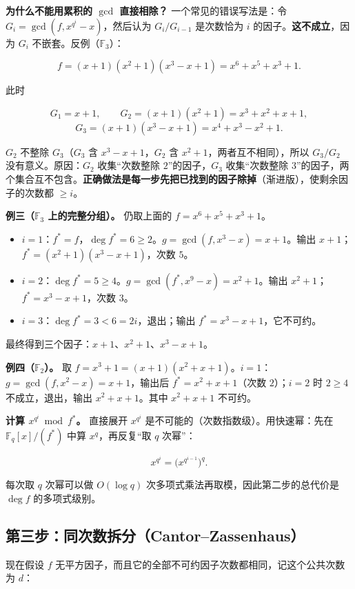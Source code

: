 \textbf{为什么不能用累积的 $\gcd$ 直接相除？} 一个常见的错误写法是：令 $G_i=\gcd(f,x^{q^i}-x)$，然后认为 $G_i/G_{i-1}$ 是次数恰为 $i$ 的因子。\textbf{这不成立}，因为 $G_i$ 不嵌套。反例（$\mathbb F_3$）：

\[
f=(x+1)(x^2+1)(x^3-x+1)=x^6+x^5+x^3+1 .
\]

此时

\[
G_1=x+1,\qquad G_2=(x+1)(x^2+1)=x^3+x^2+x+1,
\]
\[
G_3=(x+1)(x^3-x+1)=x^4+x^3-x^2+1 .
\]

$G_2$ 不整除 $G_3$（$G_3$ 含 $x^3-x+1$，$G_2$ 含 $x^2+1$，两者互不相同），所以 $G_3/G_2$ 没有意义。原因：$G_2$ 收集“次数整除 $2$”的因子，$G_3$ 收集“次数整除 $3$”的因子，两个集合互不包含。\textbf{正确做法是每一步先把已找到的因子除掉}（渐进版），使剩余因子的次数都 $\ge i$。

\textbf{例三（$\mathbb F_3$ 上的完整分组）。} 仍取上面的 $f=x^6+x^5+x^3+1$。

\begin{itemize}
\item $i=1$：$f^\ast=f$，$\deg f^\ast=6\ge2$。$g=\gcd(f,x^3-x)=x+1$。输出 $x+1$；$f^\ast=(x^2+1)(x^3-x+1)$，次数 $5$。
\item $i=2$：$\deg f^\ast=5\ge4$。$g=\gcd(f^\ast,x^9-x)=x^2+1$。输出 $x^2+1$；$f^\ast=x^3-x+1$，次数 $3$。
\item $i=3$：$\deg f^\ast=3<6=2i$，退出；输出 $f^\ast=x^3-x+1$，它不可约。
\end{itemize}


最终得到三个因子：$x+1$、$x^2+1$、$x^3-x+1$。

\textbf{例四（$\mathbb F_2$）。} 取 $f=x^3+1=(x+1)(x^2+x+1)$。$i=1$：$g=\gcd(f,x^2-x)=x+1$，输出后 $f^\ast=x^2+x+1$（次数 $2$）；$i=2$ 时 $2\ge4$ 不成立，退出，输出 $x^2+x+1$。其中 $x^2+x+1$ 不可约。

\textbf{计算 $x^{q^i}\bmod f^\ast$。} 直接展开 $x^{q^i}$ 是不可能的（次数指数级）。用快速幂：先在 $\mathbb F_q[x]/(f^\ast)$ 中算 $x^q$，再反复“取 $q$ 次幂”：

\[
x^{q^i}=\bigl(x^{q^{i-1}}\bigr)^{q}.
\]

每次取 $q$ 次幂可以做 $O(\log q)$ 次多项式乘法再取模，因此第二步的总代价是 $\deg f$ 的多项式级别。

\subsection{第三步：同次数拆分（Cantor–Zassenhaus）}


现在假设 $f$ 无平方因子，而且它的全部不可约因子次数都相同，记这个公共次数为 $d$：

